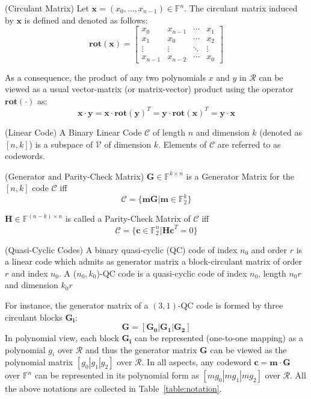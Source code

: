\documentclass[preprint]{iacrtrans}
\begin{document}
\begin{definition}{(Circulant Matrix)}
Let $\mathbf{x}=(x_0,\ldots,x_{n-1})\in \mathbb{F}^n$. The circulant matrix induced by $\mathbf{x}$ is defined and denoted as follows:
\[
 \mathbf{rot(x)} = \left[ \begin{array}{cccc}
        x_0 & x_{n-1} & \cdots &x_{1}\\
        x_{1} & x_{0} & \cdots &x_{2}\\
        \vdots & \vdots & \ddots & \vdots \\
        x_{n-1} & x_{n-2} & \cdots & x_{0}
        \end{array}\right ]
\]
\end{definition}

As a consequence, the product of any two polynomials $x$ and $y$ in $\mathcal{R}$ can be viewed as a usual vector-matrix (or matrix-vector) product using the operator $\mathbf{rot(\cdot)}$ as:
\[
   \mathbf{x\cdot y}=\mathbf{x}\cdot \mathbf{rot(y)}^T=\mathbf{y}\cdot \mathbf{rot(x)}^T=\mathbf{y\cdot x}
\]

\begin{definition}{(Linear Code)}
A Binary Linear Code $\mathcal{C}$ of length $n$ and dimension $k$ (denoted as $[n,k]$) is a subspace of $\mathcal{V}$ of dimension $k$. Elements of $\mathcal{C}$ are referred to as codewords.
\end{definition}

\begin{definition}{(Generator and Parity-Check Matrix)}
$\mathbf{G}\in \mathbb{F}^{k\times n}$ is a Generator Matrix for the $[n,k]$ code $\mathcal{C}$ iff
\[
\mathcal{C}=\{\mathbf{mG}|\mathbf{m}\in \mathbb{F}_2^k\}
\]

$\mathbf{H}\in \mathbb{F}^{(n-k)\times n}$ is called a Parity-Check Matrix of $\mathcal{C}$ iff
\[
\mathcal{C}=\{\mathbf{c} \in \mathbb{F}_2^n |\mathbf{Hc}^T=0\}
\]
\end{definition}


\begin{definition}{(Quasi-Cyclic Codes)}
A binary quasi-cyclic (QC) code of index $n_0$ and order $r$ is a linear code which admits as generator matrix a block-circulant matrix of order $r$ and index $n_0$.
A ($n_0,k_0$)-QC code is a quasi-cyclic code of index $n_0$, length $n_0r$ and dimension $k_0r$
\end{definition}

For instance, the generator matrix of a $(3,1)$-QC code is formed by three circulant blocks $\mathbf{G_i}$:
\[
\mathbf{G}=[\mathbf{G_0}|\mathbf{G_1}|\mathbf{G_2}]
\]
In polynomial view, each block $\mathbf{G_i}$ can be represented (one-to-one mapping) as a polynomial $g_i$ over $\mathcal{R}$ and thus the generator matrix $\mathbf{G}$ can be viewed as the polynomial matrix $[g_0|g_1|g_2]$ over $\mathcal{R}$. In all aspects, any codeword $\mathbf{c}=\mathbf{m}\cdot\mathbf{G}$ over $\mathbb{F}^{n}$ can be represented in its polynomial form as $[mg_0|mg_1|mg_2]$ over $\mathcal{R}$. All the above notations are collected in
Table~\ref{table:notation}.
\end{document}
